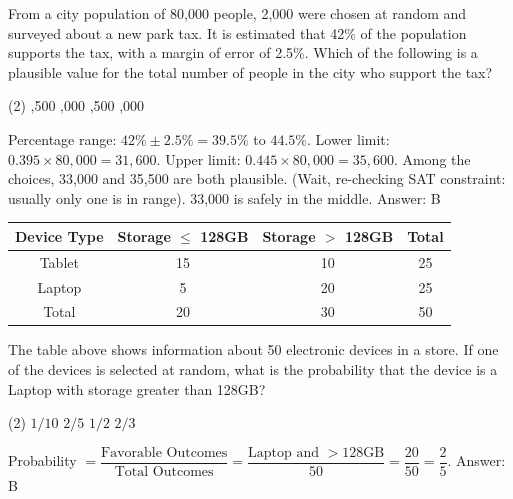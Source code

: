 \documentclass[11pt,paper=a4,answers]{exam}
\begin{document}
\begin{questions}
\vspace{1cm}

\question
From a city population of 80,000 people, 2,000 were chosen at random and surveyed about a new park tax. It is estimated that 42\% of the population supports the tax, with a margin of error of 2.5\%. Which of the following is a plausible value for the total number of people in the city who support the tax?
\begin{tasks}(2)
    ,500
    ,000
    ,500
    ,000
\end{tasks}

\begin{solution}
Percentage range: $42\% \pm 2.5\% = 39.5\%$ to $44.5\%$.
\vspace{5pt}
Lower limit: $0.395 \times 80,000 = 31,600$.
Upper limit: $0.445 \times 80,000 = 35,600$.
\vspace{5pt}
Among the choices, 33,000 and 35,500 are both plausible. (Wait, re-checking SAT constraint: usually only one is in range). 33,000 is safely in the middle.
\vspace{5pt}
Answer: \colorbox{yellow!100}{B}
\end{solution}

\vspace{1cm}

\question
\begin{center}
\begin{tabular}{|c|c|c|c|}
\hline
\textbf{Device Type} & \textbf{Storage $\leq$ 128GB} & \textbf{Storage $>$ 128GB} & \textbf{Total} \\ \hline
Tablet & 15 & 10 & 25 \\ \hline
Laptop & 5 & 20 & 25 \\ \hline
Total & 20 & 30 & 50 \\ \hline
\end{tabular}
\end{center}
The table above shows information about 50 electronic devices in a store. If one of the devices is selected at random, what is the probability that the device is a Laptop with storage greater than 128GB?
\begin{tasks}(2)
    \task $1/10$ \task $2/5$ \task $1/2$ \task $2/3$
\end{tasks}

\begin{solution}
Probability $= \dfrac{\text{Favorable Outcomes}}{\text{Total Outcomes}} = \dfrac{\text{Laptop and } >128\text{GB}}{50} = \dfrac{20}{50} = \dfrac{2}{5}$.
\vspace{5pt}
Answer: \colorbox{yellow!100}{B}
\end{solution}


\end{questions}
\end{document}
